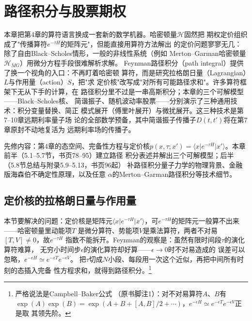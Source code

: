 \chapter{路径积分与股票期权}

本章把第4章的算符语言换成一套新的数学机器。哈密顿量$\mathcal{H}$固然把
期权定价组织成了"传播算符$e^{-\tau H}$的矩阵元"，但能直接用算符方法解出
的定价问题寥寥无几：除了自由Black--Scholes情形，一般的非线性系统（例如
Merton--Garman哈密顿量$\mathcal{H}_{MG}$）用微分方程手段很难解析求解。
Feynman路径积分（path integral）提供了换一个视角的入口：不再盯着哈密顿
算符，而是研究拉格朗日量（Lagrangian）$L$与作用量（action）$S$，把"求
定价核"改写成"对所有可能路径求和"。许多算符框架下无从下手的计算，在
路径积分里不过是一串高斯积分；本章的三个可解模型——Black--Scholes核、
简谐振子、随机波动率股票——分别演示了三种通用技术：积分变量替换、简正
模式展开（傅里叶展开）与微扰展开。这三种技术是第7--10章远期利率量子场
论的全部数学预备，其中简谐振子传播子$D(t,t')$将在第7章原封不动地复活为
远期利率场的传播子。

先修内容：第4章的态空间、完备性方程与定价核$p(x,\tau;x')=\langle x\vert
e^{-\tau H}\vert x'\rangle$。本章前半（5.1--5.7节，书页78--95）建立路径
积分表述并解出三个可解模型；后半（5.8节总结与附录5.9--5.13，书页96起）
补路径积分量子力学的物理背景、金融版海森伯不确定性原理，以及任意
$\alpha$的Merton--Garman路径积分等技术细节。

\section{定价核的拉格朗日量与作用量}

本节要解决的问题：定价核是矩阵元$\langle x\vert e^{-\tau H}\vert
x'\rangle$，可$e^{-\tau H}$的矩阵元一般算不出来——哈密顿量里动能项$T$
是微分算符、势能项$V$是乘法算符，两者不对易$[T,V]\neq0$，故$e^{-\tau H}$
指数不能拆开。Feynman的观察是：虽然有限时间段$\tau$的演化算符难算，
无穷小时间步$\epsilon$的演化算符却好算——$\epsilon\to0$时不对易造成的
误差可以忽略，$e^{-\epsilon H}\simeq e^{-\epsilon T}e^{-\epsilon V}$。
把$\tau$切成$N$小段、每段用一次这个近似，再把中间所有时刻的态插入完备
性方程求和，就得到路径积分。\footnote{严格说法是Campbell--Baker公式
（原书脚注1）：对不对易算符$A$、$B$有$\exp(A)\exp(B)=\exp(A+B+[A,B]/2
+\cdots)$，$e^{-\epsilon H}\simeq e^{-\epsilon T}e^{-\epsilon V}$正是取
其领先阶。}


